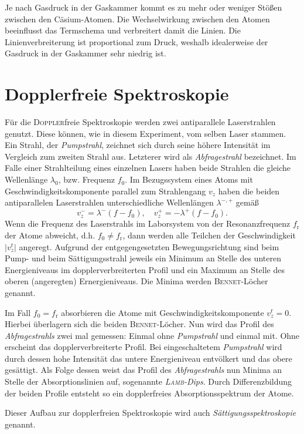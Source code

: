 \documentclass[../bericht.tex]{subfiles}
\begin{document}
        Je nach Gasdruck in der Gaskammer kommt es zu mehr oder weniger Stößen zwischen den Cäsium-Atomen. Die Wechselwirkung zwischen den Atomen beeinflusst das Termschema und verbreitert damit die Linien. Die Linienverbreiterung ist proportional zum Druck, weshalb idealerweise der Gasdruck in der Gaskammer sehr niedrig ist.


    \section{Dopplerfreie Spektroskopie}

      Für die \textsc{Doppler}freie Spektroskopie werden zwei antiparallele Laserstrahlen genutzt. Diese können, wie in diesem Experiment, vom selben Laser stammen. Ein Strahl, der \textit{Pumpstrahl}, zeichnet sich durch seine höhere Intensität im Vergleich zum zweiten Strahl aus. Letzterer wird als \textit{Abfragestrahl} bezeichnet.
      Im Falle einer Strahlteilung eines einzelnen Lasers haben beide Strahlen die gleiche Wellenlänge $\lambda_0$, bzw. Frequenz $f_0$. Im Bezugssystem eines Atoms mit Geschwindigkeitskomponente parallel zum Strahlengang $v_z$ haben die beiden antiparallelen Laserstrahlen unterschiedliche Wellenlängen $\lambda ^{-,+}$ gemäß
      \begin{equation*}
        v_z^-=\lambda^- (f-f_0),\quad v_z^+=-\lambda^+ (f-f_0).
      \end{equation*}
      \medskip
      Wenn die Frequenz des Laserstrahls im Laborsystem von der Resonanzfrequenz $f_\mathrm{r}$ der Atome abweicht, d.h. $f_0\ne f_\mathrm{r}$, dann werden alle Teilchen der Geschwindigkeit $|v_z^\mathrm{r}|$ angeregt. Aufgrund der entgegengesetzten Bewegungsrichtung sind beim Pump- und beim Sättigungsstrahl jeweils ein Minimum an Stelle des unteren Energieniveaus im dopplerverbreiterten Profil und ein Maximum an Stelle des oberen (angeregten) Ernergieniveaus. Die Minima werden \textsc{Bennet}-Löcher genannt.
      \medskip

      Im Fall $f_0 = f_\mathrm{r}$ absorbieren die Atome mit Geschwindigkeitskomponente $v_z^\mathrm{r} = 0$. Hierbei überlagern sich die beiden \textsc{Bennet}-Löcher. Nun wird das Profil des \textit{Abfragestrahls} zwei mal gemessen: Einmal ohne \textit{Pumpstrahl} und einmal mit. Ohne erscheint das dopplerverbreiterte Profil. Bei eingeschaltetem \textit{Pumpstrahl} wird durch dessen hohe Intensität das untere Energieniveau entvölkert und das obere gesättigt. Als Folge dessen weist das Profil des \textit{Abfragestrahls} nun Minima an Stelle der Absorptionslinien auf, sogenannte \textit{\textsc{Lamb}-Dips}. Durch Differenzbildung der beiden Profile entsteht so ein dopplerfreies Absorptionsspektrum der Atome.

      Dieser Aufbau zur dopplerfreien Spektroskopie wird auch \textit{Sättigungsspektroskopie} genannt.
\end{document}
